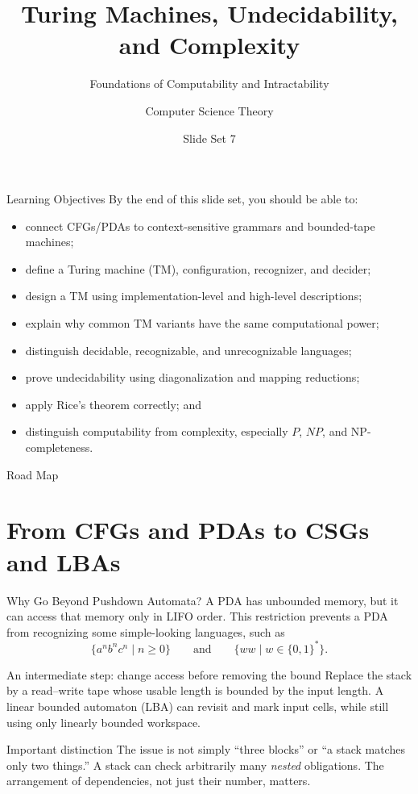\documentclass[10pt]{beamer}
\title{Turing Machines, Undecidability, and Complexity}
\subtitle{Foundations of Computability and Intractability}
\author{Computer Science Theory}
\date{Slide Set 7}
\begin{document}
\begin{frame}
  \titlepage
\end{frame}

\begin{frame}{Learning Objectives}
  \small
  By the end of this slide set, you should be able to:
  \begin{itemize}
    \item connect CFGs/PDAs to context-sensitive grammars and bounded-tape machines;
    \item define a Turing machine (TM), configuration, recognizer, and decider;
    \item design a TM using implementation-level and high-level descriptions;
    \item explain why common TM variants have the same computational power;
    \item distinguish decidable, recognizable, and unrecognizable languages;
    \item prove undecidability using diagonalization and mapping reductions;
    \item apply Rice's theorem correctly; and
    \item distinguish computability from complexity, especially $P$, $NP$, and NP-completeness.
  \end{itemize}
\end{frame}

\begin{frame}{Road Map}
  \tableofcontents
\end{frame}

\section{From CFGs and PDAs to CSGs and LBAs}

\begin{frame}{Why Go Beyond Pushdown Automata?}
  \small
  A PDA has unbounded memory, but it can access that memory only in LIFO order.
  This restriction prevents a PDA from recognizing some simple-looking languages, such as
  \[
    \{a^n b^n c^n \mid n\ge 0\}
    \qquad\text{and}\qquad
    \{ww \mid w\in\{0,1\}^*\}.
  \]
  \begin{block}{An intermediate step: change access before removing the bound}
    Replace the stack by a read--write tape whose usable length is bounded
    by the input length. A linear bounded automaton (LBA) can revisit and
    mark input cells, while still using only linearly bounded workspace.
  \end{block}
  \begin{alertblock}{Important distinction}
    The issue is not simply ``three blocks'' or ``a stack matches only two
    things.'' A stack can check arbitrarily many \emph{nested} obligations.
    The arrangement of dependencies, not just their number, matters.
  \end{alertblock}
\end{frame}
\end{document}
